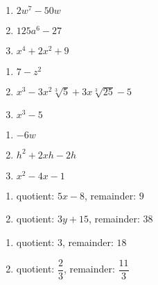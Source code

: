 \begin{multicols}{3}
\begin{enumerate}
\setcounter{enumi}{\value{HW}}

\item $2w^7 - 50w$
\item $125a^6 - 27$
\item $x^4+2x^2+9$


\setcounter{HW}{\value{enumi}}
\end{enumerate}
\end{multicols}

\begin{multicols}{3}
\begin{enumerate}
\setcounter{enumi}{\value{HW}}

\item $7-z^2$
\item $x^3 - 3x^2\sqrt[3]{5} + 3x\sqrt[3]{25} - 5$
\item $x^3 - 5$

\setcounter{HW}{\value{enumi}}
\end{enumerate}
\end{multicols}

\begin{multicols}{3}
\begin{enumerate}
\setcounter{enumi}{\value{HW}}


\item $-6w$
\item $h^2 + 2xh - 2h$
\item $x^2 - 4x - 1$ 

\setcounter{HW}{\value{enumi}}
\end{enumerate}
\end{multicols}



\begin{multicols}{2}
\begin{enumerate}
\setcounter{enumi}{\value{HW}}

\item quotient: $5x-8$, remainder: $9$ 
\item quotient: $3y+15$, remainder: $38$

\setcounter{HW}{\value{enumi}}
\end{enumerate}
\end{multicols}


\begin{multicols}{2}
\begin{enumerate}
\setcounter{enumi}{\value{HW}}

\item quotient: $3$, remainder: $18$ 
\item quotient: $\dfrac{2}{3}$, remainder: $\dfrac{11}{3}$

\setcounter{HW}{\value{enumi}}
\end{enumerate}
\end{multicols}


